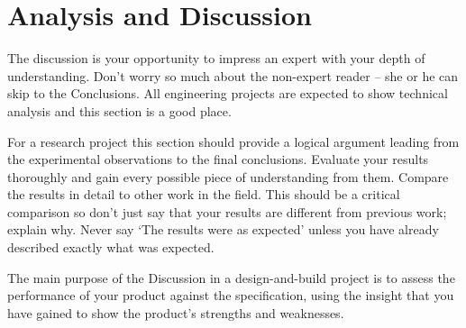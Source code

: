 \section{Analysis and Discussion}

The discussion is your opportunity to impress an expert with your depth of
understanding. Don’t worry so much about the non-expert reader – she or he can
skip to the Conclusions. All engineering projects are expected to show technical
analysis and this section is a good place.

For a research project this section should provide a logical argument leading
from the experimental observations to the final conclusions. Evaluate your
results thoroughly and gain every possible piece of understanding from them.
Compare the results in detail to other work in the field. This should be a
critical comparison so don’t just say that your results are different from
previous work; explain why. Never say ‘The results were as expected’ unless you
have already described exactly what was expected.

The main purpose of the Discussion in a design-and-build project is to assess
the performance of your product against the specification, using the insight
that you have gained to show the product’s strengths and weaknesses.
